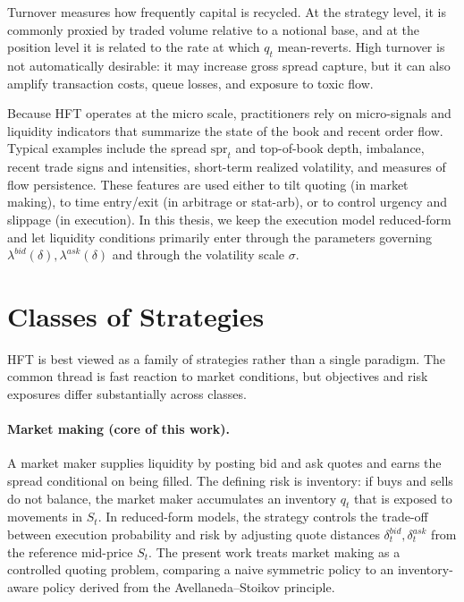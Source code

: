 \documentclass[a4paper,10pt,titlepage,oneside,openany]{book}
\theoremstyle{plain}\newtheorem{theorem}{Theorem}[chapter]
\theoremstyle{definition}\newtheorem{definition}{Definition}[chapter]
\theoremstyle{remark}\newtheorem{remark}{Remark}[chapter]
\begin{document}
Turnover measures how frequently capital is recycled. At the strategy level, it is commonly proxied by traded volume relative to a notional base, and at the position level it is related to the rate at which $q_t$ mean-reverts. High turnover is not automatically desirable: it may increase gross spread capture, but it can also amplify transaction costs, queue losses, and exposure to toxic flow.

Because HFT operates at the micro scale, practitioners rely on micro-signals and liquidity indicators that summarize the state of the book and recent order flow. Typical examples include the spread $\mathrm{spr}_t$ and top-of-book depth, imbalance, recent trade signs and intensities, short-term realized volatility, and measures of flow persistence. These features are used either to tilt quoting (in market making), to time entry/exit (in arbitrage or stat-arb), or to control urgency and slippage (in execution). In this thesis, we keep the execution model reduced-form and let liquidity conditions primarily enter through the parameters governing $\lambda^{bid}(\delta),\lambda^{ask}(\delta)$ and through the volatility scale $\sigma$.

\section{Classes of Strategies}
HFT is best viewed as a family of strategies rather than a single paradigm. The common thread is fast reaction to market conditions, but objectives and risk exposures differ substantially across classes.

\paragraph{Market making (core of this work).}
A market maker supplies liquidity by posting bid and ask quotes and earns the spread conditional on being filled. The defining risk is inventory: if buys and sells do not balance, the market maker accumulates an inventory $q_t$ that is exposed to movements in $S_t$. In reduced-form models, the strategy controls the trade-off between execution probability and risk by adjusting quote distances $\delta_t^{bid},\delta_t^{ask}$ from the reference mid-price $S_t$. The present work treats market making as a controlled quoting problem, comparing a naive symmetric policy to an inventory-aware policy derived from the Avellaneda--Stoikov principle.
\end{document}
